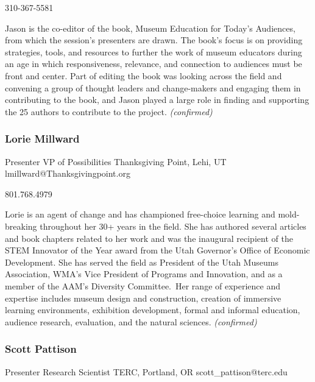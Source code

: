 \documentclass{report}
\begin{document}
                310-367-5581\newline

                Jason is the co-editor of the book, Museum Education for Today’s Audiences, from which the session’s presenters are drawn. The book’s focus is on providing strategies, tools, and resources to further the work of museum educators during an age in which responsiveness, relevance, and connection to audiences must be front and center. Part of editing the book was looking across the field and convening a group of thought leaders and change-makers and engaging them in contributing to the book, and Jason played a large role in finding and supporting the 25 authors to contribute to the project.\newline
                \emph{ (confirmed) }
              

              
                \subsubsection*{ Lorie Millward }
                Presenter\newline
                VP of Possibilities\newline
                Thanksgiving Point, Lehi, UT
                \newline
                lmillward@Thanksgivingpoint.org\newline
                
                801.768.4979\newline

                Lorie is an agent of change and has championed free-choice learning and mold-breaking throughout her 30+ years in the field. She has authored several articles and book chapters related to her work and was the inaugural recipient of the STEM Innovator of the Year award from the Utah Governor’s Office of Economic Development. She has served the field as President of the Utah Museums Association, WMA’s Vice President of Programs and Innovation, and as a member of the AAM’s Diversity Committee. Her range of experience and expertise includes museum design and construction, creation of immersive learning environments, exhibition development, formal and informal education, audience research, evaluation, and the natural sciences.
                \emph{ (confirmed) }
              

              
                \subsubsection*{ Scott Pattison }
                Presenter\newline
                Research Scientist\newline
                TERC, Portland, OR
                \newline
                scott_pattison@terc.edu\newline
                
\end{document}
